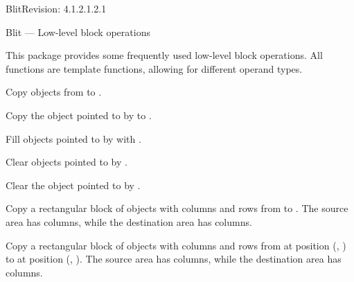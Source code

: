 \begin{manpage}{\libtitle}{Blit}{$ $Revision: 4.1.2.1.2.1 $ $}

\subtitle{Name}
    Blit --- Low-level block operations


\subtitle{Description}
    This package provides some frequently used low-level block operations.
    All functions are template functions, allowing for different operand types.


\subtitle{Declaration}


\subtitle{Operations}

    Copy  objects from  to .

    Copy the object pointed to by  to .

    Fill  objects pointed to by  with .

    Clear  objects pointed to by .

    Clear the object pointed to by .

    Copy a rectangular block of objects with  columns and
     rows from  to . The source area has
     columns, while the destination area has  columns.

    Copy a rectangular block of objects with  columns and
     rows from  at position (, ) to
     at position (, ). The source area has
     columns, while the destination area has  columns.


\end{manpage}
